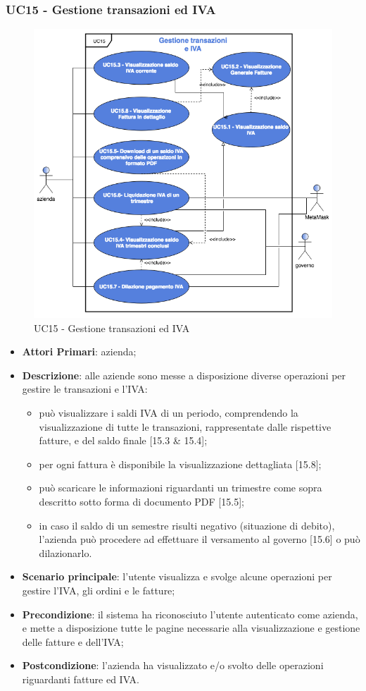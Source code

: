 \subsubsection{UC15 - Gestione transazioni ed IVA}
\begin{figure}[H]
	\includegraphics[width=12cm]{res/images/UC15-OK.png}
	\centering
	\caption{UC15 - Gestione transazioni ed IVA}
\end{figure}
\begin{itemize}
	\item \textbf{Attori Primari}: azienda;
	\item \textbf{Descrizione}: alle aziende sono messe a disposizione diverse operazioni per gestire le transazioni e l'IVA:
	\begin{itemize}
		\item può visualizzare i saldi IVA di un periodo, comprendendo la visualizzazione di tutte le transazioni, rappresentate dalle rispettive fatture, e del saldo finale [15.3 \& 15.4];
		\item per ogni fattura è disponibile la visualizzazione dettagliata [15.8];
		\item può scaricare le informazioni riguardanti un trimestre come sopra descritto sotto forma di documento PDF [15.5]; 
		\item in caso il saldo di un semestre risulti negativo (situazione di debito), l'azienda può procedere ad effettuare il versamento al governo [15.6] o può dilazionarlo\glosp [15.7].
	\end{itemize}
	\item \textbf{Scenario principale}: l'utente visualizza e svolge alcune operazioni per gestire l'IVA, gli ordini e le fatture;
	\item \textbf{Precondizione}: il sistema ha riconosciuto l'utente autenticato come azienda, e mette a disposizione tutte le pagine necessarie alla visualizzazione e gestione delle fatture e dell'IVA;
	\item \textbf{Postcondizione}: l'azienda ha visualizzato e/o svolto delle operazioni riguardanti fatture ed IVA.
\end{itemize} 
